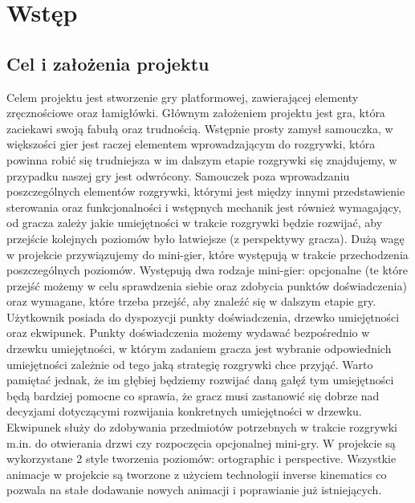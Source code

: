 \documentclass[oneside,polski,logo]{amuthesis}
\author{Kamil Tyrek, Mateusz Hypś, Jakub Kozubal}
\date{Poznań, styczeń 2021}
\begin{document}
\maketitle
\makestatement
\tableofcontents


\chapter{Wstęp}
\section{Cel i założenia projektu}
Celem projektu jest stworzenie gry platformowej, zawierającej elementy zręcznościowe oraz łamigłówki. Głównym założeniem projektu jest gra, która zaciekawi swoją fabułą oraz trudnością. Wstępnie prosty zamysł samouczka, w większości gier jest raczej elementem wprowadzającym do rozgrywki, która powinna robić się trudniejsza w im dalszym etapie rozgrywki się znajdujemy, w przypadku naszej gry jest odwrócony. Samouczek poza wprowadzaniu poszczególnych elementów rozgrywki, którymi jest między innymi przedstawienie sterowania oraz funkcjonalności i wstępnych mechanik jest również wymagający, od gracza zależy jakie umiejętności w trakcie rozgrywki będzie rozwijać, aby przejście kolejnych poziomów było łatwiejsze (z perspektywy gracza). Dużą wagę w projekcie przywiązujemy do mini-gier, które występują w trakcie przechodzenia poszczególnych poziomów. Występują dwa rodzaje mini-gier: opcjonalne (te które przejść możemy w celu sprawdzenia siebie oraz zdobycia punktów doświadczenia) oraz wymagane, które trzeba przejść, aby znaleźć się w dalszym etapie gry. Użytkownik posiada do dyspozycji punkty doświadczenia, drzewko umiejętności oraz ekwipunek. Punkty doświadczenia możemy wydawać bezpośrednio w drzewku umiejętności, w którym zadaniem gracza jest wybranie odpowiednich umiejętności zależnie od tego jaką strategię rozgrywki chce przyjąć. Warto pamiętać jednak, że im głębiej będziemy rozwijać daną gałęź tym umiejętności będą bardziej pomocne co sprawia, że gracz musi zastanowić się dobrze nad decyzjami dotyczącymi rozwijania konkretnych umiejętności w drzewku. Ekwipunek służy do zdobywania przedmiotów potrzebnych w trakcie rozgrywki m.in. do otwierania drzwi czy rozpoczęcia opcjonalnej mini-gry. W projekcie są wykorzystane 2 style tworzenia poziomów: ortographic i perspective. Wszystkie animacje w projekcie są tworzone z użyciem technologii inverse kinematics co pozwala na stałe dodawanie nowych animacji i poprawianie już istniejących.
\end{document}
